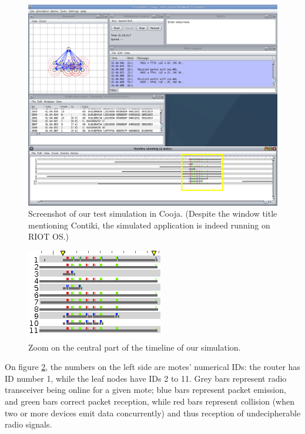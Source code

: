 \documentclass[a4paper,twoside]{article}
\begin{document}
\begin{figure}[ptb]
\centering
\includegraphics[width=15.75cm]{S-CoSenS-Cooja10.png}
\caption{Screenshot of our test simulation in Cooja. 
(Despite the window title mentioning Contiki, the simulated application
 is indeed running on RIOT OS.)}
\label{Screenshot}
\end{figure}

\begin{figure}[pbt]
\centering
\includegraphics{S-CoSenS-Cooja10-Timeline.png}
\caption{Zoom on the central part of the timeline of our simulation.}
\label{ZoomTimeline}
\end{figure}

On figure \ref{ZoomTimeline}, the numbers on the left side are motes'
numerical IDs: the router has ID number \textsf{1}, while the leaf nodes
have IDs \textsf{2} to \textsf{11}. Grey bars represent radio transceiver
being online for a given mote; blue bars represent packet emission, and green
bars correct packet reception, while red bars represent collision (when
two or more devices emit data concurrently) and thus reception of
undecipherable radio signals.
\end{document}
